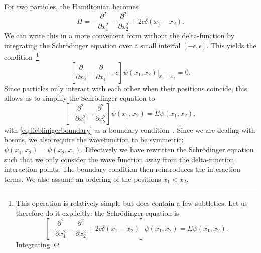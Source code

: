 \documentclass[11pt, a4paper]{report} %
\begin{document}
For two particles, the Hamiltonian becomes
\begin{equation}
	H =  - \frac{\partial^2}{\partial x_1^2} - \frac{\partial^2}{\partial x_2^2} + 2c \delta(x_1 - x_2).
\end{equation}
We can write this in a more convenient form without the delta-function by integrating the Schrödinger equation over a small interfal \([-\epsilon,\epsilon]\).
This yields the condition~\cite{Lieb1963}\footnote{This operation is relatively simple but does contain a few subtleties. Let us therefore do it explicitly:
the Schrödinger equation is
\begin{equation}
	\left[- \frac{\partial^2}{\partial x_1^2} - \frac{\partial^2}{\partial x_2^2} + 2c \delta(x_1 - x_2)\right] \psi(x_1, x_2) = E \psi(x_1,x_2).
\end{equation} 
Integrating~\cite{Griffiths1993}
}
\begin{equation}\label{eq:lieblinigerboundary}
	\left[\frac{\partial}{\partial x_2} - \frac{\partial}{\partial x_1} - c\right] \psi(x_1, x_2)\bigg\rvert_{x_1 = x_2} = 0.
\end{equation}
Since particles only interact with each other when their positions coincide, this allows us to simplify the Schrödinger equation to
\begin{equation}\label{eq:lieblinigersimple}
	\left[- \frac{\partial^2}{\partial x_1^2} - \frac{\partial^2}{\partial x_2^2}\right] \psi(x_1, x_2) = E \psi(x_1,x_2),
\end{equation}
with \cref{eq:lieblinigerboundary} as a boundary condition~\cite{Lieb1963}.
Since we are dealing with bosons, we also require the wavefunction to be symmetric: \(\psi(x_1,x_2) = \psi(x_2,x_1)\).
Effectively we have rewritten the Schrödinger equation such that we only consider the wave function away from the delta-function interaction points.
The boundary condition then reintroduces the interaction terms.
We also assume an ordering of the positions \(x_1 < x_2\).
\end{document}
